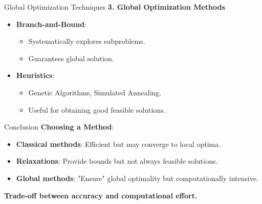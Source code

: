 \documentclass[11pt, aspectratio=169]{beamer}
\begin{document}
\begin{frame}{Global Optimization Techniques}
    \textbf{3. Global Optimization Methods}
    \begin{itemize}
        \item \textbf{Branch-and-Bound}:
        \begin{itemize}
            \item Systematically explores subproblems.
            \item Guarantees global solution.
        \end{itemize}
        \item \textbf{Heuristics}:
        \begin{itemize}
            \item Genetic Algorithms, Simulated Annealing.
            \item Useful for obtaining good feasible solutions.
        \end{itemize}
    \end{itemize}
\end{frame}

\begin{frame}{Conclusion}
    \textbf{Choosing a Method}:
    \begin{itemize}
        \item \textbf{Classical methods}: Efficient but may converge to local optima.
        \item \textbf{Relaxations}: Provide bounds but not always feasible solutions.
        \item \textbf{Global methods}: "Ensure" global optimality but computationally intensive.
    \end{itemize}
    
    \textbf{Trade-off between accuracy and computational effort.}
\end{frame}
\end{document}
